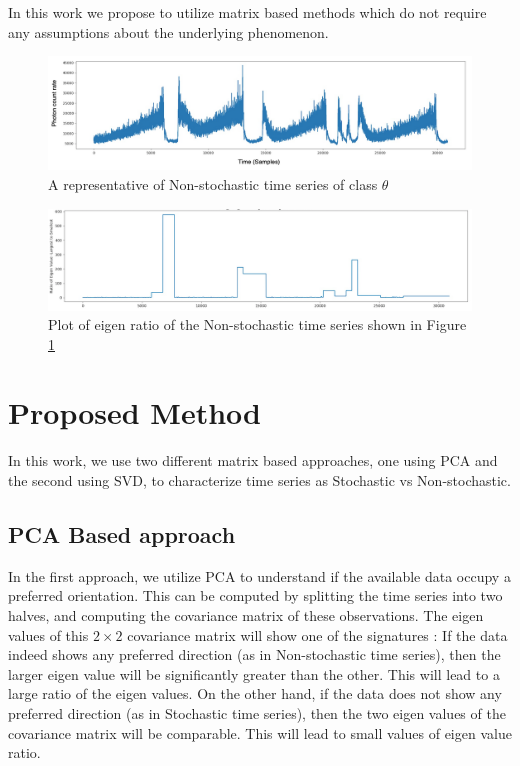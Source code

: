 \documentclass[10pt,conference]{IEEEtran}
\begin{document}
In this work we propose to utilize matrix based methods which do not require any assumptions about the underlying phenomenon.

\begin{figure}[ht]
  \centering
  \includegraphics[width=0.8\linewidth]{theta_ts_edited.drawio.png}
  \caption{A representative of Non-stochastic time series of class $\theta$}
  \label{theta_ts}
\end{figure}
\begin{figure}[ht]
  \centering
  \includegraphics[width=0.8\linewidth]{theta_ts_eig.png}
  \caption{Plot of eigen ratio of the  Non-stochastic time series shown in Figure \ref{theta_ts}}
  \label{theta_eig}
\end{figure}

\section{Proposed Method}
In this work, we use two different matrix based approaches, one using PCA and the second using SVD, to characterize time series as Stochastic vs Non-stochastic.

\subsection{PCA Based approach}
In the first approach, we utilize PCA to understand if the available data occupy a preferred orientation. This can be computed by splitting the time series into two halves, and computing the covariance matrix of these observations. The eigen values of this $2 \times 2$ covariance matrix will show one of the signatures : If the data indeed shows any preferred direction (as in Non-stochastic time series), then the larger eigen value will be significantly greater than the other. This will lead to a large ratio of the eigen values. On the other hand, if the data does not show any preferred direction (as in Stochastic time series), then the two eigen values of the covariance matrix will be comparable. This will lead to small values of eigen value ratio.
\end{document}
